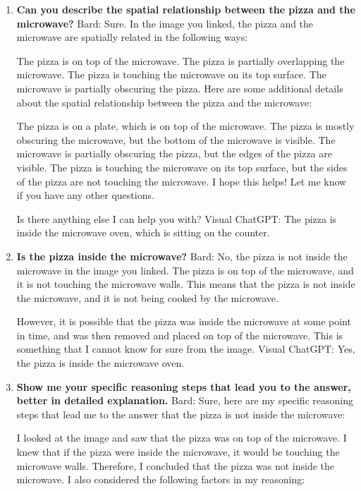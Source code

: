     \begin{enumerate}
        \item \textbf{Can you describe the spatial relationship between the pizza and the microwave?}
        \subitem Bard: 
        Sure. In the image you linked, the pizza and the microwave are spatially related in the following ways:
        
        The pizza is on top of the microwave.
        The pizza is partially overlapping the microwave.
        The pizza is touching the microwave on its top surface.
        The microwave is partially obscuring the pizza.
        Here are some additional details about the spatial relationship between the pizza and the microwave:
        
        The pizza is on a plate, which is on top of the microwave.
        The pizza is mostly obscuring the microwave, but the bottom of the microwave is visible.
        The microwave is partially obscuring the pizza, but the edges of the pizza are visible.
        The pizza is touching the microwave on its top surface, but the sides of the pizza are not touching the microwave.
        I hope this helps! Let me know if you have any other questions.
        
        Is there anything else I can help you with?
        \subitem Visual ChatGPT: The pizza is inside the microwave oven, which is sitting on the counter.
        \item \textbf{Is the pizza inside the microwave?}
        \subitem Bard: 
        No, the pizza is not inside the microwave in the image you linked. The pizza is on top of the microwave, and it is not touching the microwave walls. This means that the pizza is not inside the microwave, and it is not being cooked by the microwave.
        
        However, it is possible that the pizza was inside the microwave at some point in time, and was then removed and placed on top of the microwave. This is something that I cannot know for sure from the image.
        \subitem Visual ChatGPT: Yes, the pizza is inside the microwave oven.
        \item \textbf{Show me your specific reasoning steps that lead you to the answer, better in detailed explanation.}
        \subitem Bard: 
        Sure, here are my specific reasoning steps that lead me to the answer that the pizza is not inside the microwave:
        
        I looked at the image and saw that the pizza was on top of the microwave.
        I knew that if the pizza were inside the microwave, it would be touching the microwave walls.
        Therefore, I concluded that the pizza was not inside the microwave.
        I also considered the following factors in my reasoning:
        

\end{enumerate}
